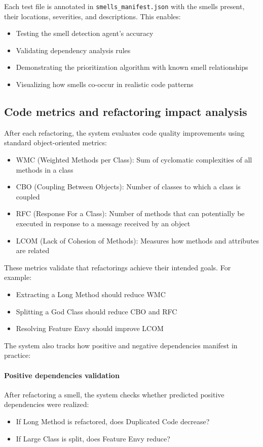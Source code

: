 Each test file is annotated in \texttt{smells\_manifest.json} with the smells present, their locations, severities, and descriptions. This enables:
\begin{itemize}
    \item Testing the smell detection agent's accuracy
    \item Validating dependency analysis rules
    \item Demonstrating the prioritization algorithm with known smell relationships
    \item Visualizing how smells co-occur in realistic code patterns
\end{itemize}

\subsection{Code metrics and refactoring impact analysis}

After each refactoring, the system evaluates code quality improvements using standard object-oriented metrics:

\begin{itemize}
    \item WMC (Weighted Methods per Class): Sum of cyclomatic complexities of all methods in a class
    \item CBO (Coupling Between Objects): Number of classes to which a class is coupled
    \item RFC (Response For a Class): Number of methods that can potentially be executed in response to a message received by an object
    \item LCOM (Lack of Cohesion of Methods): Measures how methods and attributes are related
\end{itemize}

These metrics validate that refactorings achieve their intended goals. For example:
\begin{itemize}
    \item Extracting a Long Method should reduce WMC
    \item Splitting a God Class should reduce CBO and RFC
    \item Resolving Feature Envy should improve LCOM
\end{itemize}

The system also tracks how positive and negative dependencies manifest in practice:

\paragraph{Positive dependencies validation}
After refactoring a smell, the system checks whether predicted positive dependencies were realized:
\begin{itemize}
    \item If Long Method is refactored, does Duplicated Code decrease?
    \item If Large Class is split, does Feature Envy reduce?
\end{itemize}


